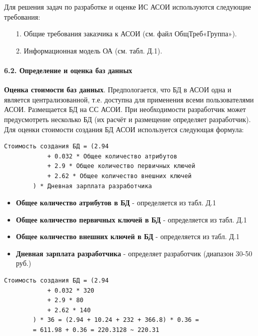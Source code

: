 \documentclass[12pt, a4paper, simple]{eskdtext}
\begin{document}
    Для решения задач по разработке и оценке ИС АСОИ используются следующие требования:
    
    \begin{enumerate}
        \item[1.] Общие требования заказчика к АСОИ (см. файл ОбщТреб«Группа»).
        \item[2.] Информационная модель ОА (см. табл. Д.1).
    \end{enumerate}

    \paragraph{6.2. Определение и оценка баз данных} \hspace{0pt}

    \textbf{Оценка стоимости баз данных}.
    Предпологается, что БД в АСОИ одна и является централизованной,
    т.е. доступна для применения всеми пользователями АСОИ.
    Размещается БД на СС АСОИ.
    При необходимости разработчик может предусмотреть несколько БД
    (их расчёт и размещение определяет разработчик).
    Для оценки стоимости создания БД АСОИ используется следующая формула:

    \begin{lstlisting}[language=Formula]
        Стоимость создания БД = (2.94
            + 0.032 * Общее количество атрибутов
            + 2.9 * Общее количество первичных ключей
            + 2.62 * Общее количество внешних ключей
        ) * Дневная зарплата разработчика
\end{lstlisting}
 
    \begin{itemize}
        \item \textbf{Общее количество атрибутов в БД} - определяется из табл. Д.1
        \item \textbf{Общее количество первичных ключей в БД} - определяется из табл. Д.1
        \item \textbf{Общее количество внешних ключей в БД} - определяется из табл. Д.1
        \item \textbf{Дневная зарплата разработчика} - определяет разработчик (диапазон 30-50 руб.)
    \end{itemize}

    \begin{lstlisting}[language=MyFormula]
        Стоимость создания БД = (2.94
            + 0.032 * 320
            + 2.9 * 80
            + 2.62 * 140
        ) * 36 = (2.94 + 10.24 + 232 + 366.8) * 0.36 =
        = 611.98 + 0.36 = 220.3128 ~ 220.31
\end{lstlisting}
\end{document}

